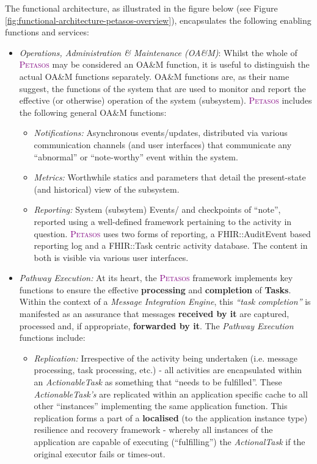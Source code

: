 \documentclass[a4paper]{book}
\newcommand{\petasos}{\textsc{\textcolor{Purple}{\small{Petasos }}}}
\begin{document}
    The functional architecture, as illustrated in the figure below (see Figure \ref{fig:functional-architecture-petasos-overview}), encapsulates the following enabling functions and services:
    \begin{itemize}
        \item \textit{Operations, Administration \& Maintenance (OA\&M)}: Whilst the whole of \petasos may be considered an OA\&M function, it is useful to distinguish the actual OA\&M functions separately. OA\&M functions are, as their name suggest, the functions of the system that are used to monitor and report the effective (or otherwise) operation of the system (subsystem). \petasos includes the following general OA\&M functions:
        \begin{itemize}
            \item \textit{Notifications:} Asynchronous events/updates, distributed via various communication channels (and user interfaces) that communicate any ``abnormal'' or ``note-worthy'' event within the system.
            \item \textit{Metrics:} Worthwhile statics and parameters that detail the present-state (and historical) view of the subsystem.
            \item \textit{Reporting:} System (subsytem) Events/ and checkpoints of ``note'', reported using a well-defined framework pertaining to the activity in question. \petasos uses two forms of reporting, a FHIR::AuditEvent based reporting log and a FHIR::Task centric activity database. The content in both is visible via various user interfaces.
        \end{itemize}
        \item \textit{Pathway Execution:} At its heart, the \petasos framework implements key functions to ensure the effective \textbf{processing} and \textbf{completion} of \textbf{Tasks}. Within the context of a \textit{Message Integration Engine}, this \textit{``task completion''} is manifested as an assurance that messages \textbf{received by it} are captured, processed and, if appropriate, \textbf{forwarded by it}. The \textit{Pathway Execution} functions include:
        \begin{itemize}
            \item \textit{Replication:} Irrespective of the activity being undertaken (i.e. message processing, task processing, etc.) - all activities are encapsulated within an \textit{ActionableTask} as something that ``needs to be fulfilled''. These \textit{ActionableTask's} are replicated within an application specific cache to all other ``instances'' implementing the same application function. This replication forms a part of a \textbf{localised} (to the application instance type) resilience and recovery framework - whereby all instances of the application are capable of executing (``fulfilling'') the \textit{ActionalTask} if the original executor fails or times-out.

\end{itemize}
\end{itemize}
\end{document}
